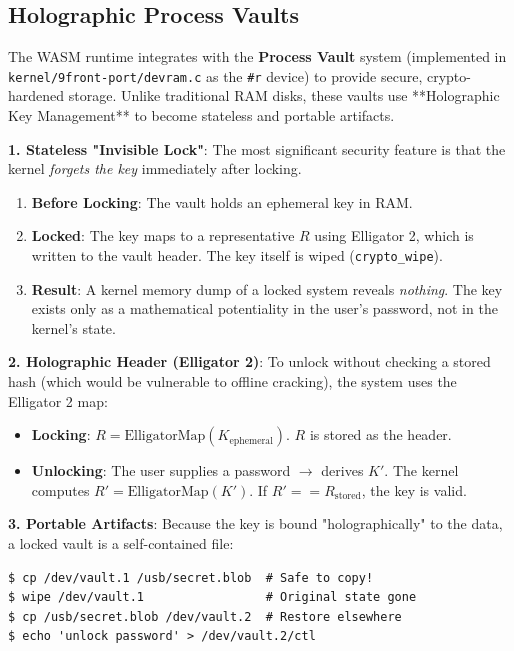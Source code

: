\documentclass[11pt,letterpaper]{article}
\begin{document}
\subsection{Holographic Process Vaults}

The WASM runtime integrates with the \textbf{Process Vault} system (implemented in \texttt{kernel/9front-port/devram.c} as the \texttt{\#r} device) to provide secure, crypto-hardened storage. Unlike traditional RAM disks, these vaults use **Holographic Key Management** to become stateless and portable artifacts.

\textbf{1. Stateless "Invisible Lock"}:
The most significant security feature is that the kernel \textit{forgets the key} immediately after locking.
\begin{enumerate}
    \item \textbf{Before Locking}: The vault holds an ephemeral key in RAM.
    \item \textbf{Locked}: The key maps to a representative $R$ using Elligator 2, which is written to the vault header. The key itself is wiped (\texttt{crypto_wipe}).
    \item \textbf{Result}: A kernel memory dump of a locked system reveals \textit{nothing}. The key exists only as a mathematical potentiality in the user's password, not in the kernel's state.
\end{enumerate}

\textbf{2. Holographic Header (Elligator 2)}:
To unlock without checking a stored hash (which would be vulnerable to offline cracking), the system uses the Elligator 2 map:
\begin{itemize}
    \item \textbf{Locking}: $R = \text{ElligatorMap}(K_{\text{ephemeral}})$. $R$ is stored as the header.
    \item \textbf{Unlocking}: The user supplies a password $\rightarrow$ derives $K'$. The kernel computes $R' = \text{ElligatorMap}(K')$. If $R' == R_{\text{stored}}$, the key is valid.
\end{itemize}

\textbf{3. Portable Artifacts}:
Because the key is bound "holographically" to the data, a locked vault is a self-contained file:
\begin{verbatim}
$ cp /dev/vault.1 /usb/secret.blob  # Safe to copy!
$ wipe /dev/vault.1                 # Original state gone
$ cp /usb/secret.blob /dev/vault.2  # Restore elsewhere
$ echo 'unlock password' > /dev/vault.2/ctl
\end{verbatim}
\end{document}
